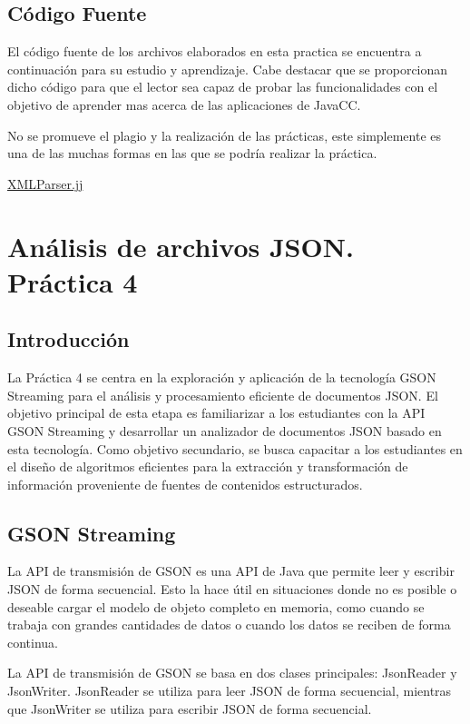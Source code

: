 \subsection{Código Fuente}

El código fuente de los archivos elaborados en esta practica se encuentra a continuación para su estudio y aprendizaje. Cabe destacar que se proporcionan dicho código para que el lector sea capaz de probar las funcionalidades con el objetivo de aprender mas acerca de las aplicaciones de JavaCC.

No se promueve el plagio y la realización de las prácticas, este simplemente es una de las muchas formas en las que se podría realizar la práctica.

\hyperref[sec:XMLParser]{XMLParser.jj}

\section{Análisis de archivos JSON. Práctica 4}

\subsection{Introducción}

La Práctica 4 se centra en la exploración y aplicación de la tecnología GSON Streaming para el análisis y procesamiento eficiente de documentos JSON. El objetivo principal de esta etapa es familiarizar a los estudiantes con la API GSON Streaming y desarrollar un analizador de documentos JSON basado en esta tecnología. Como objetivo secundario, se busca capacitar a los estudiantes en el diseño de algoritmos eficientes para la extracción y transformación de información proveniente de fuentes de contenidos estructurados.

\subsection{GSON Streaming}

La API de transmisión de GSON es una API de Java que permite leer y escribir JSON de forma secuencial. Esto la hace útil en situaciones donde no es posible o deseable cargar el modelo de objeto completo en memoria, como cuando se trabaja con grandes cantidades de datos o cuando los datos se reciben de forma continua.

La API de transmisión de GSON se basa en dos clases principales: JsonReader y JsonWriter. JsonReader se utiliza para leer JSON de forma secuencial, mientras que JsonWriter se utiliza para escribir JSON de forma secuencial.

